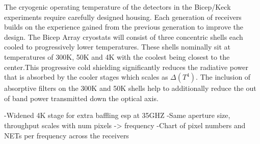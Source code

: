 \documentclass[12pt]{article}
\begin{document}
The cryogenic operating temperature of the detectors in the Bicep/Keck
experiments require carefully designed housing. Each generation of receivers
builds on the experience gained from the previous generation to improve the
design. The Bicep Array cryostats will consist of three concentric shells each
cooled to progressively lower temperatures. These shells nominally sit at
temperatures of 300K, 50K and 4K with the coolest being closest to the
center.This progressive cold shielding significantly reduces the radiative
power that is absorbed by the cooler stages which scales as $\Delta (T^4)$.
The inclusion of absorptive filters on the 300K and 50K shells help to
additionally reduce the out of band power transmitted down the optical axis.


-Widened 4K stage for extra baffling esp at 35GHZ
-Same aperture size, throughput scales with num pixels -> frequency
-Chart of pixel numbers and NETs per frequency across the receivers

\printbibliography
\end{document}
